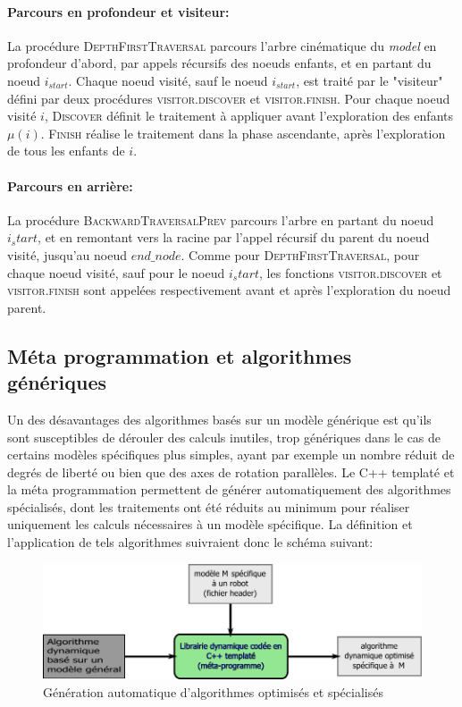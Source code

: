 \documentclass{report}
\begin{document}
\paragraph{Parcours en profondeur et visiteur:}
La procédure \textsc{DepthFirstTraversal} parcours l'arbre cinématique du \emph{model} en profondeur d'abord, par appels récursifs des noeuds enfants, et en partant du noeud $i_{start}$. Chaque noeud visité, sauf le noeud $i_{start}$, est traité par le "visiteur" défini par deux procédures \textsc{visitor.discover} et \textsc{visitor.finish}. Pour chaque noeud visité $i$, \textsc{Discover} définit le traitement à appliquer avant l'exploration des enfants $\mu(i)$. \textsc{Finish} réalise le traitement dans la phase ascendante, \cad après l'exploration de tous les enfants de $i$.

\paragraph{Parcours en arrière:}
La procédure \textsc{BackwardTraversalPrev} parcours l'arbre en partant du noeud $i_start$, et en remontant vers la racine par l'appel récursif du parent du noeud visité, jusqu'au noeud $end\_node$. Comme pour \textsc{DepthFirstTraversal}, pour chaque noeud visité, sauf pour le noeud $i_start$, les fonctions \textsc{visitor.discover} et \textsc{visitor.finish} sont appelées respectivement avant et après l'exploration du noeud parent.


\subsection{Méta programmation et algorithmes génériques}

Un des désavantages des algorithmes basés sur un modèle générique est qu'ils sont susceptibles de dérouler des calculs inutiles, trop génériques dans le cas de certains modèles spécifiques plus simples, ayant par exemple un nombre réduit de degrés de liberté ou bien que des axes de rotation parallèles. Le C++ templaté et la méta programmation permettent de générer automatiquement des algorithmes spécialisés, dont les traitements ont été réduits au minimum pour réaliser uniquement les calculs nécessaires à un modèle spécifique. La définition et l'application de tels algorithmes suivraient donc le schéma suivant:

\begin{figure}[H]
\centering
\includegraphics[width=\textwidth]{figs/principeAlgoGenerique.pdf}
\caption{Génération automatique d'algorithmes optimisés et spécialisés}
\end{figure}
\end{document}
